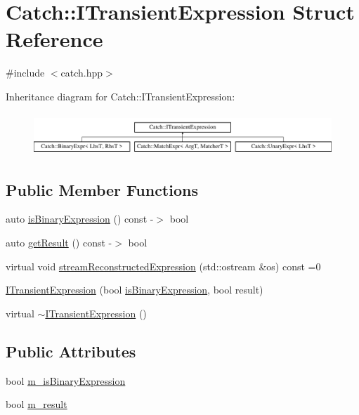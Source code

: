 \hypertarget{struct_catch_1_1_i_transient_expression}{}\section{Catch\+::I\+Transient\+Expression Struct Reference}
\label{struct_catch_1_1_i_transient_expression}


{\ttfamily \#include $<$catch.\+hpp$>$}

Inheritance diagram for Catch\+::I\+Transient\+Expression\+:\begin{figure}[H]
\begin{center}
\leavevmode
\includegraphics[height=1.588652cm]{struct_catch_1_1_i_transient_expression}
\end{center}
\end{figure}
\subsection*{Public Member Functions}
\begin{DoxyCompactItemize}
\item 
auto \mbox{\hyperlink{struct_catch_1_1_i_transient_expression_a3b436e13a0a6d3522bbf70d4e31deb22}{is\+Binary\+Expression}} () const -\/$>$ bool
\item 
auto \mbox{\hyperlink{struct_catch_1_1_i_transient_expression_a101c7db86c87eff93a8ff496720e6320}{get\+Result}} () const -\/$>$ bool
\item 
virtual void \mbox{\hyperlink{struct_catch_1_1_i_transient_expression_aabe1889df9c6e639a24afb08d8a0fe9e}{stream\+Reconstructed\+Expression}} (std\+::ostream \&os) const =0
\item 
\mbox{\hyperlink{struct_catch_1_1_i_transient_expression_aafe69572b7ed884e63ec81f58d4afd8c}{I\+Transient\+Expression}} (bool \mbox{\hyperlink{struct_catch_1_1_i_transient_expression_a3b436e13a0a6d3522bbf70d4e31deb22}{is\+Binary\+Expression}}, bool result)
\item 
virtual \mbox{\hyperlink{struct_catch_1_1_i_transient_expression_aeadf426de589938c4964fe4068eeee77}{$\sim$\+I\+Transient\+Expression}} ()
\end{DoxyCompactItemize}
\subsection*{Public Attributes}
\begin{DoxyCompactItemize}
\item 
bool \mbox{\hyperlink{struct_catch_1_1_i_transient_expression_a75ce48da824d514d08152d396abb28d8}{m\+\_\+is\+Binary\+Expression}}
\item 
bool \mbox{\hyperlink{struct_catch_1_1_i_transient_expression_a4646e2b5e0156e913653ec3b9b60c942}{m\+\_\+result}}
\end{DoxyCompactItemize}


